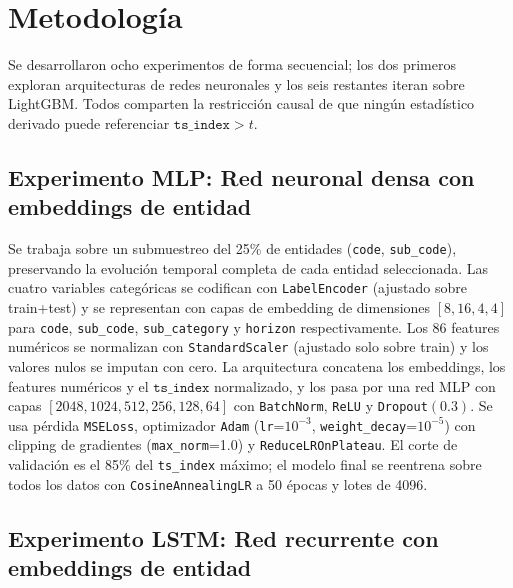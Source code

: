 \documentclass{article}
\begin{document}

\section{Metodología}
\label{sec:metodologia}

Se desarrollaron ocho experimentos de forma secuencial; los dos primeros exploran arquitecturas de redes neuronales y los seis restantes iteran sobre LightGBM. Todos comparten la restricción causal de que ningún estadístico derivado puede referenciar $\texttt{ts\_index} > t$.

\subsection{Experimento MLP: Red neuronal densa con embeddings de entidad}

Se trabaja sobre un submuestreo del 25\% de entidades (\texttt{code}, \texttt{sub\_code}), preservando la evolución temporal completa de cada entidad seleccionada. Las cuatro variables categóricas se codifican con \texttt{LabelEncoder} (ajustado sobre train+test) y se representan con capas de embedding de dimensiones $[8, 16, 4, 4]$ para \texttt{code}, \texttt{sub\_code}, \texttt{sub\_category} y \texttt{horizon} respectivamente. Los 86 features numéricos se normalizan con \texttt{StandardScaler} (ajustado solo sobre train) y los valores nulos se imputan con cero. La arquitectura concatena los embeddings, los features numéricos y el $\texttt{ts\_index}$ normalizado, y los pasa por una red MLP con capas $[2048, 1024, 512, 256, 128, 64]$ con \texttt{BatchNorm}, \texttt{ReLU} y \texttt{Dropout}$(0.3)$. Se usa pérdida \texttt{MSELoss}, optimizador \texttt{Adam} (\texttt{lr}=$10^{-3}$, \texttt{weight\_decay}=$10^{-5}$) con clipping de gradientes (\texttt{max\_norm}=1.0) y \texttt{ReduceLROnPlateau}. El corte de validación es el 85\% del \texttt{ts\_index} máximo; el modelo final se reentrena sobre todos los datos con \texttt{CosineAnnealingLR} a 50 épocas y lotes de 4096.

\subsection{Experimento LSTM: Red recurrente con embeddings de entidad}
\end{document}
